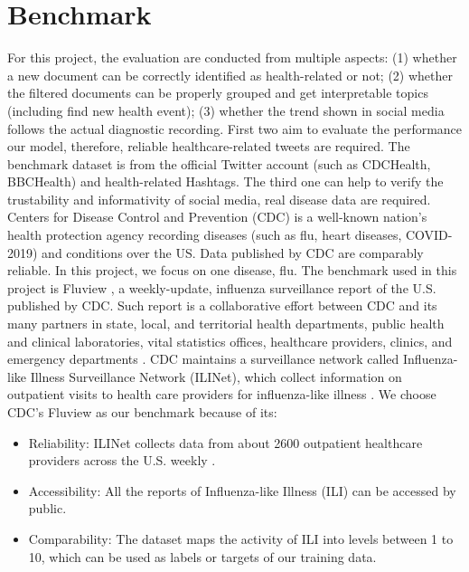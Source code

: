 \section{Benchmark}
For this project, the evaluation are conducted from multiple aspects: (1) whether a new document can be correctly identified as health-related or not; (2) whether the filtered documents can be properly grouped and get interpretable topics (including find new health event); (3) whether the trend shown in social media follows the actual diagnostic recording. First two aim to evaluate the performance our model, therefore, reliable healthcare-related tweets are required. The benchmark dataset is from the official Twitter account (such as CDCHealth, BBCHealth) and health-related Hashtags. The third one can help to verify the trustability and informativity of social media, real disease data are required. Centers for Disease Control and Prevention (CDC)\cite{cdc.gov} is a well-known nation's health protection agency recording diseases (such as flu, heart diseases, COVID-2019) and conditions over the US. Data published by CDC are comparably reliable. In this project, we focus on one disease, flu. The benchmark used in this project is Fluview \cite{cdc:fluView}, a weekly-update, influenza surveillance report of the U.S. published by CDC. Such report is a collaborative effort between CDC and its many partners in state, local, and territorial health departments, public health and clinical laboratories, vital statistics offices, healthcare providers, clinics, and emergency departments \cite{cdc.gov}. CDC maintains a surveillance network called Influenza-like Illness Surveillance Network (ILINet), which collect information on outpatient visits to health care providers for influenza-like illness \cite{cdc.gov}. We choose CDC's Fluview as our benchmark because of its:
\begin{itemize}
    \item Reliability: ILINet collects data from about 2600 outpatient healthcare providers across the U.S. weekly \cite{cdc.gov}.
    \item Accessibility: All the reports of Influenza-like Illness (ILI) can be accessed by public.
    \item Comparability: The dataset maps the activity of ILI into levels between 1 to 10, which can be used as labels or targets of our training data.
\end{itemize}
